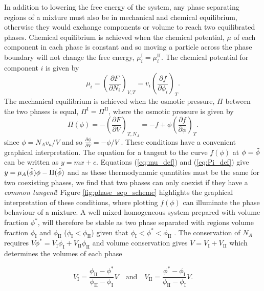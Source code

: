In addition to lowering the free energy of the system, any phase separating regions of a mixture must also be in mechanical and chemical equilibrium, otherwise they would exchange components or volume to reach two equilibrated phases. Chemical equilibrium is achieved when the chemical potential, $\mu$ of each component in each phase is constant and so moving a particle across the phase boundary will not change the free energy, $\mu_i^{\mathrm{I}}=\mu_i^{\mathrm{II}}$. The chemical potential for component $i$ is given by
\begin{equation}
    \mu_i = \left(\frac{\partial F}{\partial N_i}\right)_{V, T} = v_i \left(\frac{\partial f}{\partial \phi_i}\right)_{T}.
    \label{eq:mu_def}
\end{equation}
The mechanical equilibrium is achieved when the osmotic pressure, $\Pi$ between the two phases is equal, $\Pi^{\mathrm{I}}=\Pi^{\mathrm{II}}$, where the osmotic pressure is given by
\begin{equation}
    \Pi(\phi) = -\left(\frac{\partial F}{\partial V}\right)_{T, N_A} = -f + \phi \left(\frac{\partial f}{\partial \phi}\right)_{T}.
    \label{eq:Pi_def}
\end{equation}
since $\phi = N_A v_a/V$ and so $\frac{\partial \phi}{\partial V} = -\phi/V$ \cite{doi_soft_2013}. These conditions have a convenient graphical interpretation. The equation for a tangent to the curve $f(\phi)$ at $\phi=\Tilde{\phi}$ can be written as $y=mx+c$. Equations (\ref{eq:mu_def}) and (\ref{eq:Pi_def}) give $y=\mu_A(\Tilde{\phi})\phi - \Pi(\Tilde{\phi})$ and as these thermodynamic quantities must be the same for two coexisting phases, we find that two phases can only coexist if they have a \textit{common tangent}! Figure \ref{fig:phase_sep_scheme} highlights the graphical interpretation of these conditions, where plotting $f(\phi)$ can illuminate the phase behaviour of a mixture. A well mixed homogeneous system prepared with volume fraction $\phi^*$, will therefore be stable as two phase separated with regions volume fraction $\phi_{\mathrm{I}}$ and $\phi_{\mathrm{II}}$ ($\phi_{\mathrm{I}} < \phi_{\mathrm{II}}$) given that $\phi_{\mathrm{I}} < \phi^* < \phi_{\mathrm{II}}$ \cite{weber2019physics}. The conservation of $N_A$ requires $V\phi^* = V_{\mathrm{I}}\phi_{\mathrm{I}} +V_{\mathrm{II}}\phi_{\mathrm{II}}$ and volume conservation gives $V = V_{\mathrm{I}}+V_{\mathrm{II}}$ which determines the volumes of each phase

\begin{equation}
    V_{\mathrm{I}} = \frac{\phi_{\mathrm{II}}-\phi^*}{\phi_{\mathrm{II}}-\phi_{\mathrm{I}}}V
    \quad
    \textrm{and}
    \quad
    V_{\mathrm{II}} = \frac{\phi^*-\phi_{\mathrm{I}}}{\phi_{\mathrm{II}}-\phi_{\mathrm{I}}}V.
\end{equation}

